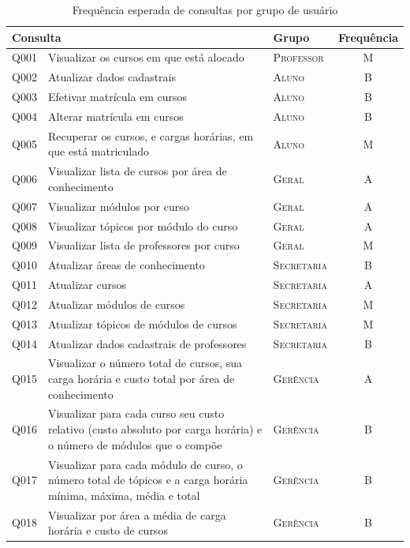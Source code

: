 \documentclass{article}
\begin{document}
\begin{table}[!htb]
    \caption{Frequ\^encia esperada de consultas por grupo de usu\'ario}
	\begin{tabularx}{\textwidth}{p{0.65cm} m{11.0cm} p{1.75cm} c}
		\toprule
		\multicolumn{2}{l}{\textbf{Consulta}} &
		\textbf{Grupo} &
		\textbf{Frequ\^encia}  \\ \midrule
		Q001 & Visualizar os cursos em que est\'a alocado & \textsc{Professor} & M \\
		Q002 & Atualizar dados cadastrais & \textsc{Aluno} & B \\
		Q003 & Efetivar matr\'icula em cursos & \textsc{Aluno} & B \\
		Q004 & Alterar matr\'icula em cursos & \textsc{Aluno} & B \\
		Q005 & Recuperar os cursos, e cargas hor\'arias, em que est\'a matriculado & \textsc{Aluno} & M \\
		Q006 & Visualizar lista de cursos por \'area de conhecimento & \textsc{Geral} & A \\
		Q007 & Visualizar m\'odulos por curso & \textsc{Geral} & A \\
		Q008 & Visualizar t\'opicos por m\'odulo do curso & \textsc{Geral} & A \\
		Q009 & Visualizar lista de professores por curso & \textsc{Geral} & M \\
		Q010 & Atualizar \'areas de conhecimento & \textsc{Secretaria} & B \\
		Q011 & Atualizar cursos & \textsc{Secretaria} & A \\
		Q012 & Atualizar m\'odulos de cursos & \textsc{Secretaria} & M \\
		Q013 & Atualizar t\'opicos de m\'odulos de cursos & \textsc{Secretaria} & M \\
		Q014 & Atualizar dados cadastrais de professores & \textsc{Secretaria} & B \\
		Q015 & Visualizar o n\'umero total de cursos, sua carga hor\'aria e custo total por \'area de conhecimento & \textsc{Ger\^encia} & A \\
		Q016 & Visualizar para cada curso seu custo relativo (custo absoluto por carga hor\'aria) e o n\'umero de m\'odulos que o comp\~oe & \textsc{Ger\^encia} & B \\
		Q017 & Visualizar para cada módulo de curso, o número total de tópicos e a carga horária mínima, máxima, média e total & \textsc{Ger\^encia} & B \\
		Q018 & Visualizar por área a média de carga horária e custo de cursos & \textsc{Ger\^encia} & B \\

\end{tabularx}
\end{table}
\end{document}
